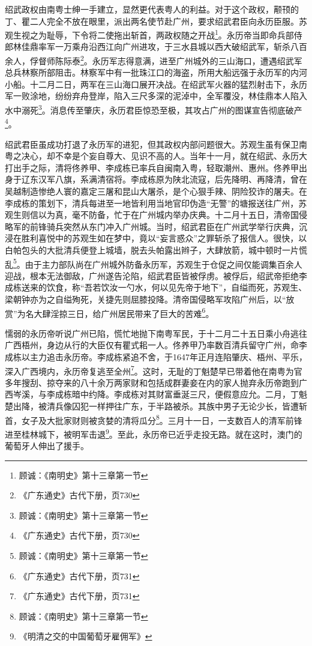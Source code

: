 绍武政权由南粤士绅一手建立，显然更代表粤人的利益。对于这个政权，颟顸的丁、瞿二人完全不放在眼里，派出两名使节赴广州，要求绍武君臣向永历臣服。苏观生视之为耻辱，下令将二使拖出斩首，两政权随之开战\footnote{顾诚：《南明史》第十三章第一节}。永历帝当即命兵部侍郎林佳鼎率军一万乘舟沿西江向广州进攻，于三水县城以西大破绍武军，斩杀八百余人，俘督师陈际泰\footnote{《广东通史》古代下册，页730}。永历军志得意满，进至广州城外的三山海口，遭遇绍武军总兵林察所部阻击。林察军中有一批珠江口的海盗，所用大船远强于永历军的内河小船。十二月二日，两军在三山海口展开决战。在绍武军火器的猛烈射击下，永历军一败涂地，纷纷弃舟登岸，陷入三尺多深的泥淖中，全军覆没，林佳鼎本人陷入水中溺死\footnote{顾诚：《南明史》第十三章第一节}。消息传至肇庆，永历君臣惊恐至极，其攻占广州的图谋宣告彻底破产\footnote{《广东通史》古代下册，页730}。

绍武君臣虽成功打退了永历军的进犯，但其政权内部问题很大。苏观生虽有保卫南粤之决心，却不幸是个妄自尊大、见识不高的人。当年十一月，就在绍武、永历大打出手之际，清将佟养甲、李成栋已率兵自闽南入粤，轻取潮州、惠州。佟养甲出身于辽东汉军八旗，系满清宿将。李成栋原为陕北流寇，后先降明、再降清，曾在吴越制造惨绝人寰的嘉定三屠和昆山大屠杀，是个心狠手辣、阴险狡诈的屠夫。在李成栋的策划下，清兵每进至一地皆利用当地官印伪造“无警”的塘报送往广州，苏观生则信以为真，毫不防备，忙于在广州城内举办庆典。十二月十五日，清帝国侵略军的前锋骑兵突然从东门冲入广州城。当时，绍武君臣在广州武学举行庆典，沉浸在胜利喜悦中的苏观生如在梦中，竟以“妄言惑众”之罪斩杀了报信人。很快，以白帕包头的大批清兵便登上城墙，脱去头帕露出辫子，大肆放箭，城中顿时一片慌乱\footnote{顾诚：《南明史》第十三章第一节}。由于主力部队尚在广州城外防备永历军，苏观生于仓促之间仅能调集百余人迎战，根本无法御敌，广州遂告沦陷，绍武君臣皆被俘虏。被俘后，绍武帝拒绝李成栋送来的饮食，称“吾若饮汝一勺水，何以见先帝于地下”，自缢而死，苏观生、梁朝钟亦为之自缢殉死，关捷先则屈膝投降。清帝国侵略军攻陷广州后，以“放赏”为名大肆淫掠三日，给广州居民带来了巨大的苦难\footnote{《广东通史》古代下册，页731}。

懦弱的永历帝听说广州已陷，慌忙地抛下南粤军民，于十二月二十五日乘小舟逃往广西梧州，身边从行的大臣仅有瞿式耜一人。佟养甲乃率数百清兵留守广州，命李成栋以主力追击永历帝。李成栋紧追不舍，于1647年正月连陷肇庆、梧州、平乐，深入广西境内，永历帝复逃至全州\footnote{《广东通史》古代下册，页731}。这时，无耻的丁魁楚早已带着他在南粤为官多年搜刮、掠夺来的八十余万两家财和包括成群妻妾在内的家人抛弃永历帝跑到广西岑溪，与李成栋暗中约降。李成栋对其财富垂涎三尺，便假意应允。二月，丁魁楚出降，被清兵像囚犯一样押往广东，于半路被杀。其族中男子无论少长，皆遭斩首，女子及大批家财则被贪婪的清将瓜分\footnote{顾诚：《南明史》第十三章第一节}。三月十一日，一支数百人的清军前锋进至桂林城下，被明军击退\footnote{《明清之交的中国葡萄牙雇佣军》}。至此，永历帝已近乎走投无路。就在这时，澳门的葡萄牙人伸出了援手。

